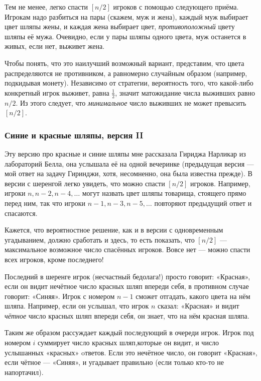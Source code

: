\medskip

Тем не менее, легко спасти $[n/2]$ игроков с помощью следующего приёма.
Игрокам надо разбиться на пары (скажем, муж и жена), каждый муж выбирает цвет шляпы жены, и каждая жена выбирает цвет, \emph{противоположный} цвету шляпы её мужа.
Очевидно, если у пары шляпы одного цвета, муж останется в живых, если нет, выживет жена.

Чтобы понять, что это наилучший возможный вариант, представим, что цвета распределяются не противником, а равномерно случайным образом (например, подкидывая монету).
Независимо от стратегии, вероятность того, что какой-либо конкретный игрок выживет, равна $\tfrac12$,
значит матожидание числа выживших равно $n/2$. 
Из этого следует, что \emph{минимальное} число выживших не может превысить $[n/2]$.\heart

\subsubsection*{Синие и красные шляпы, версия II}%

Эту версию про красные и синие шляпы мне рассказала Гириджа Нарликар из лабораторий Белла, %
она услышала её на одной вечеринке (предыдущая версия --- мой ответ на задачу Гиринджи, хотя, несомненно, она была известна прежде).
В версии с шеренгой легко увидеть, что можно спасти $[n/2]$ игроков.
Например, игроки $n, n-2, n-4,\dots$
могут назвать цвет шляпы товарища, стоящего прямо перед ним, так что игроки $n-1, n-3,n-5,\dots$
повторяют предыдущий ответ и спасаются.

\medskip

Кажется, что вероятностное решение, как и в версии с одновременным угадыванием, должно сработать и здесь, то есть показать, что $[n/2]$ --- максимальное возможное число спасённых игроков.
Вовсе нет --- можно спасти всех игроков, кроме последнего!

Последний в шеренге игрок (несчастный бедолага!) просто говорит:
«Красная», если он видит нечётное число красных шляп впереди себя, в противном случае говорит: «Синяя».
Игрок с номером $n-1$ сможет отгадать, какого цвета на нём шляпа.
Например, если он услышал, что игрок $n$ сказал:
«Красная» и видит \emph{чётное} число красных шляп впереди себя, он знает, что на нём красная шляпа.

Таким же образом рассуждает каждый последующий в очереди игрок.
Игрок под номером $i$ суммирует число красных шляп,которые он видит, и число услышанных «красных» oтветов.
Если это нечётное число, он говорит «Красная», если чётное --- «Синяя», и угадывает правильно (если только кто-то не напортачил).

